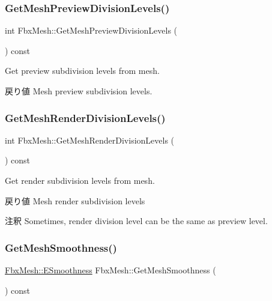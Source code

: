 \subsubsection{\texorpdfstring{Get\+Mesh\+Preview\+Division\+Levels()}{GetMeshPreviewDivisionLevels()}}
{\footnotesize\ttfamily int Fbx\+Mesh\+::\+Get\+Mesh\+Preview\+Division\+Levels (\begin{DoxyParamCaption}{ }\end{DoxyParamCaption}) const}

Get preview subdivision levels from mesh. \begin{DoxyReturn}{戻り値}
Mesh preview subdivision levels. 
\end{DoxyReturn}
\mbox{\label{class_fbx_mesh_adbcf24d50b58f317654fc771f11fe35c}} 
\subsubsection{\texorpdfstring{Get\+Mesh\+Render\+Division\+Levels()}{GetMeshRenderDivisionLevels()}}
{\footnotesize\ttfamily int Fbx\+Mesh\+::\+Get\+Mesh\+Render\+Division\+Levels (\begin{DoxyParamCaption}{ }\end{DoxyParamCaption}) const}

Get render subdivision levels from mesh. \begin{DoxyReturn}{戻り値}
Mesh render subdivision levels 
\end{DoxyReturn}
\begin{DoxyRemark}{注釈}
Sometimes, render division level can be the same as preview level. 
\end{DoxyRemark}
\mbox{\label{class_fbx_mesh_a6833d3eb2e1fe34a5073149a2eb5544a}} 
\subsubsection{\texorpdfstring{Get\+Mesh\+Smoothness()}{GetMeshSmoothness()}}
{\footnotesize\ttfamily \hyperlink{class_fbx_mesh_a7ac812140810290f718863c170279cf3}{Fbx\+Mesh\+::\+E\+Smoothness} Fbx\+Mesh\+::\+Get\+Mesh\+Smoothness (\begin{DoxyParamCaption}{ }\end{DoxyParamCaption}) const}

